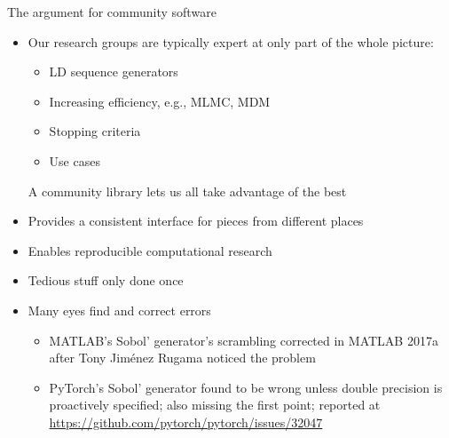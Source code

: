 \documentclass[11pt,compress,xcolor={usenames,dvipsnames},aspectratio=169]{beamer}
\begin{document}
\begin{frame}{The argument for community software}
	
	\vspace{-4ex}
	
	\begin{itemize}
	\item<+-> Our research groups are typically expert at only part of the whole picture:
			\begin{itemize}
			\item LD sequence generators
			
			\item Increasing efficiency, e.g., MLMC, MDM
			
			\item Stopping criteria
			
			\item Use cases
		\end{itemize}
	
		A community library lets us all take advantage of the best

	\item<+-> Provides a consistent interface for pieces from different places
	
	\item<+-> Enables reproducible computational research
	
	\item<+-> Tedious stuff only done once

		\item<+-> Many eyes find and correct errors
		\begin{itemize}
			\item MATLAB's Sobol' generator's  scrambling corrected in MATLAB 2017a after Tony Jim\'enez Rugama noticed the problem
			
			\item PyTorch's Sobol' generator found to be wrong unless double precision is proactively specified; also missing the first point; reported at \url{https://github.com/pytorch/pytorch/issues/32047}
		\end{itemize}
	

\end{itemize}
\end{frame}
\end{document}
